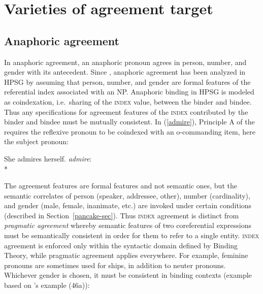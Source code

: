 \documentclass[output=paper
 	        ,biblatex
                ,babelshorthands
                ,newtxmath
                ,draftmode
                ,colorlinks, citecolor=brown
]{langscibook}
\begin{document}
\section{Varieties of agreement target} 


\subsection{Anaphoric agreement}
\label{ana-agr}\label{agreement:sec-anaphotic-agreement}

In anaphoric agreement, an anaphoric pronoun agrees in person, number, and gender with its
antecedent.  Since \citet{Pollard+Sag:1992,Pollard+Sag:1994}, anaphoric agreement has been analyzed
in HPSG by assuming that person, number, and gender are formal features of the referential index
associated with an NP.  Anaphoric binding in HPSG is modeled as coindexation, i.e.\ sharing of the
\textsc{index} value, between the binder and bindee.  Thus any specifications for agreement features
of the \textsc{index} contributed by the binder and bindee must be mutually consistent.  In
(\ref{admire}), Principle A of the   requires the
reflexive pronoun to be coindexed with an o-commanding item, here the subject pronoun:  

\begin{exe}
\ex  
 \begin{xlist}  \label{admire}
\ex She admires herself.  
\ex \textit{admire}:\\*
\end{xlist}
\end{exe}

\noindent
The agreement features are formal features and not semantic ones, but the semantic correlates of person (speaker, addressee, other), number (cardinality), and gender (male, female, inanimate, etc.) are invoked under certain conditions (described in Section~\ref{pancake-sec}).   
Thus \textsc{index} agreement is distinct from \textit{pragmatic agreement} whereby semantic features of two
coreferential expressions must be semantically consistent in order for them to refer to a single
entity.  \textsc{index} agreement is enforced only within the  syntactic domain defined by Binding Theory,
while pragmatic agreement applies everywhere.   For example, feminine pronouns are sometimes used
for ships, in addition to neuter pronouns.  Whichever gender is chosen, it must be consistent in
binding contexts (example based on \citeauthor{Pollard+Sag:1994}'s \citeyear[79]{Pollard+Sag:1994} example (46a)):
\end{document}

